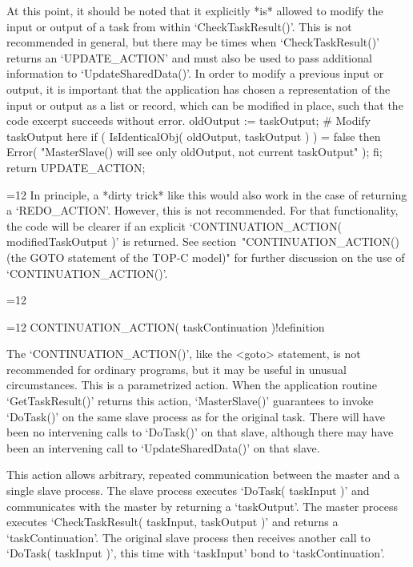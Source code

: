 
At this point, it should be noted that it explicitly *is* allowed
to modify the input or output of a task from within `CheckTaskResult()'.
This is not recommended in general, but there may be times when
`CheckTaskResult()' returns an `UPDATE_ACTION' and must also be used
to pass additional information to `UpdateSharedData()'.  In order to
modify a previous input or output, it is important that the
application has chosen a representation of the input or output as a
list or record, which can be modified in place, such that the
code excerpt succeeds without error.
\begintt
  oldOutput := taskOutput;
  # Modify taskOutput here
  if ( IsIdenticalObj( oldOutput, taskOutput ) ) = false then
    Error( "MasterSlave() will see only oldOutput, not current taskOutput" );
  fi;
  return UPDATE_ACTION;
\endtt

{=12
In principle, a *dirty trick* like this would also work in the case
of returning a `REDO_ACTION'.  However, this is not recommended.  For
that functionality, the code will be clearer if an explicit
`CONTINUATION_ACTION( modifiedTaskOutput )' is returned.  See
section~"CONTINUATION_ACTION() (the GOTO statement of the TOP-C model)"
for further discussion on the use of `CONTINUATION_ACTION()'.
\par}

{=12
\par}

{=12
\>CONTINUATION_ACTION( taskContinuation )!{definition}
\par}

The `CONTINUATION_ACTION()', like the <goto> statement, is not
recommended for ordinary programs, but it may be useful in unusual
circumstances.  This is a parametrized action.  When the application
routine `GetTaskResult()' returns this action, `MasterSlave()'
guarantees to invoke `DoTask()' on the same slave process as for the
original task.  There will have been no intervening calls to
`DoTask()' on that slave, although there may have been an intervening
call to `UpdateSharedData()' on that slave.

This action allows arbitrary, repeated communication between the
master and a single slave process.  The slave process executes
`DoTask( taskInput )' and communicates with the master by returning a
`taskOutput'.  The master process executes `CheckTaskResult( taskInput,
taskOutput )' and returns a `taskContinuation'.  The original slave
process then receives another call to `DoTask( taskInput )', this time
with `taskInput' bond to `taskContinuation'.

